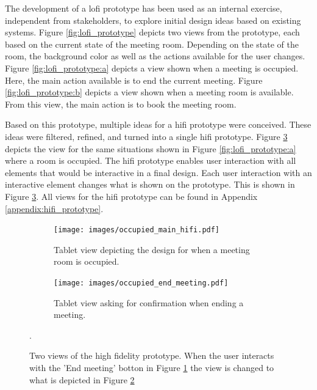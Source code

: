 The development of a lofi prototype has been used as an internal exercise, independent from stakeholders, to explore initial design ideas based on existing systems.
Figure \ref{fig:lofi_prototype} depicts two views from the prototype, each based on the current state of the meeting room.
Depending on the state of the room, the background color as well as the actions available for the user changes.
Figure \ref{fig:lofi_prototype:a} depicts a view shown when a meeting is occupied.
Here, the main action available is to end the current meeting.
Figure \ref{fig:lofi_prototype:b} depicts a view shown when a meeting room is available.
From this view, the main action is to book the meeting room.

Based on this prototype, multiple ideas for a hifi prototype were conceived.
These ideas were filtered, refined, and turned into a single hifi prototype.
Figure \ref{fig:hifi_prototype_interaction} depicts the view for the same situations shown in Figure \ref{fig:lofi_prototype:a} where a room is occupied.
The hifi prototype enables user interaction with all elements that would be interactive in a final design.
Each user interaction with an interactive element changes what is shown on the prototype. 
This is shown in Figure \ref{fig:hifi_prototype_interaction}. 
All views for the hifi prototype can be found in Appendix \ref{appendix:hifi_prototype}.

\begin{figure}
    \centering
    \begin{subfigure}[b]{0.49\textwidth}
        \centering
        \texttt{[image: images/occupied\_main\_hifi.pdf]}
        \caption{Tablet view depicting the design for when a meeting room is occupied.}
        \label{fig:hifi_prototype:a}
    \end{subfigure}
    \begin{subfigure}[b]{0.49\textwidth}
        \centering
        \texttt{[image: images/occupied\_end\_meeting.pdf]}
        \caption{Tablet view asking for confirmation when ending a meeting.}
        \label{fig:hifi_prototype:b}
    \end{subfigure}
    \caption{Two views of the high fidelity prototype. When the user interacts with the 'End meeting' botton in Figure \ref{fig:hifi_prototype:a} the view is changed to what is depicted in Figure \ref{fig:hifi_prototype:b}}.
    \label{fig:hifi_prototype_interaction}
\end{figure}
